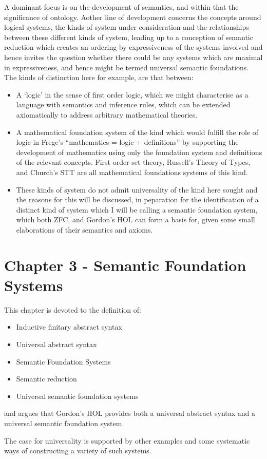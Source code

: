 A dominant focus is on the development of semantics, and within that the significance of ontology.
Aother line of development concerns the concepts around logical systems, the kinds of system under consideration and the relationships between these different kinds of system, leading up to a conception of semantic reduction which creates an ordering by expressiveness of the systems involved and hence invites the question whether there could be any systems which are maximal in expressiveness, and hence might be termed universal semantic foundations.
The kinds of distinction here for example, are that between:
\begin{itemize}
\item A `logic' in the sense of first order logic, which we might characterise as a language with semantics and inference rules, which can be extended axiomatically to address arbitrary  mathematical theories.

\item A mathematical foundation system of the kind which would fulfill the role of logic in Frege's ``mathematics = logic + definitions'' by supporting the development of mathematics using only the foundation system and definitions of the relevant concepts.
First order set theory, Russell's Theory of Types, and Church's STT are all mathematical foundations systems of this kind.

\item
These kinds of system do not admit universality of the kind here sought and the reasons for this will be discussed, in peparation for the identification of a distinct kind of system which I will be calling a semantic foundation system, which both ZFC, and Gordon's HOL can form a basis for, given some small elaborations of their semantics and axioms.

\end{itemize}

\section{Chapter 3 - Semantic Foundation Systems}

This chapter is devoted to the definition of:
\begin{itemize}
\item Inductive finitary abstract syntax
\item Universal abstract syntax
\item Semantic Foundation Systems
\item Semantic reduction
\item Universal semantic foundation systems
\end{itemize}

and argues that Gordon's HOL provides both a universal abstract syntax and a universal semantic foundation system.

The case for universality is supported by other examples and some systematic ways of constructing a variety of such systems.

